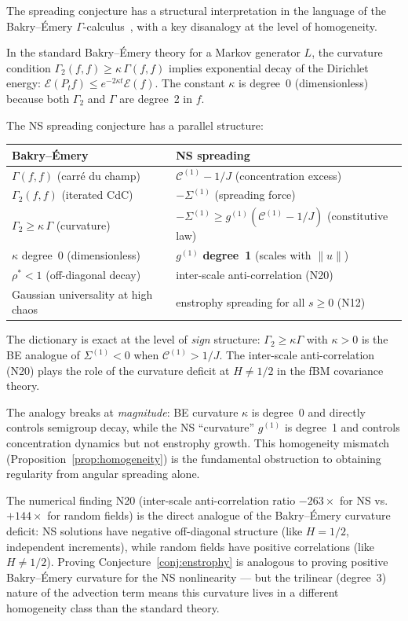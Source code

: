 \documentclass[11pt]{article}
\theoremstyle{definition}
\newcommand{\cC}{\mathcal{C}}
\begin{document}
The spreading conjecture has a structural
interpretation in the language of the Bakry--\'Emery
$\Gamma$-calculus~\cite{Fontes2026b,Fontes2026c},
with a key disanalogy at the level of homogeneity.

In the standard Bakry--\'Emery theory for a Markov
generator $L$, the curvature condition
$\Gamma_2(f,f)\geq\kappa\,\Gamma(f,f)$
implies exponential decay of the Dirichlet energy:
$\mathcal{E}(P_t f) \leq e^{-2\kappa t}\mathcal{E}(f)$.
The constant $\kappa$ is degree~0 (dimensionless)
because both $\Gamma_2$ and $\Gamma$ are degree~2
in $f$.

The NS spreading conjecture has a parallel structure:
\begin{center}
\renewcommand{\arraystretch}{1.2}
\begin{tabular}{@{}ll@{}}
\toprule
\textbf{Bakry--\'Emery} & \textbf{NS spreading} \\
\midrule
$\Gamma(f,f)$ (carr\'e du champ)
  & $\cC^{(1)}-1/J$ (concentration excess) \\
$\Gamma_2(f,f)$ (iterated CdC)
  & $-\Sigma^{(1)}$ (spreading force) \\
$\Gamma_2\geq\kappa\,\Gamma$ (curvature)
  & $-\Sigma^{(1)}\geq g^{(1)}(\cC^{(1)}-1/J)$
  (constitutive law) \\
$\kappa$ degree~0 (dimensionless)
  & $g^{(1)}$ \textbf{degree~1} (scales with $\|u\|$) \\
$\rho^*<1$ (off-diagonal decay)
  & inter-scale anti-correlation (N20) \\
Gaussian universality at high chaos
  & enstrophy spreading for all $s\geq 0$ (N12) \\
\bottomrule
\end{tabular}
\end{center}
The dictionary is exact at the level of
\emph{sign} structure: $\Gamma_2\geq\kappa\Gamma$
with $\kappa>0$ is the BE analogue of
$\Sigma^{(1)}<0$ when $\cC^{(1)}>1/J$.
The inter-scale anti-correlation (N20) plays the
role of the curvature deficit at $H\neq 1/2$
in the fBM covariance theory.

The analogy breaks at \emph{magnitude}: BE
curvature $\kappa$ is degree~0 and directly
controls semigroup decay, while the NS
``curvature'' $g^{(1)}$ is degree~1 and controls
concentration dynamics but not enstrophy growth.
This homogeneity mismatch (Proposition~\ref{prop:homogeneity})
is the fundamental obstruction to obtaining
regularity from angular spreading alone.

The numerical finding N20 (inter-scale
anti-correlation ratio $-263\times$ for NS vs.\
$+144\times$ for random fields) is the direct
analogue of the Bakry--\'Emery curvature deficit:
NS solutions have negative off-diagonal
structure (like $H=1/2$, independent increments),
while random fields have positive correlations
(like $H\neq 1/2$).  Proving
Conjecture~\ref{conj:enstrophy} is
analogous to proving positive Bakry--\'Emery
curvature for the NS nonlinearity --- but
the trilinear (degree~3) nature of the
advection term means this curvature lives in
a different homogeneity class than the standard
theory.
\end{document}
